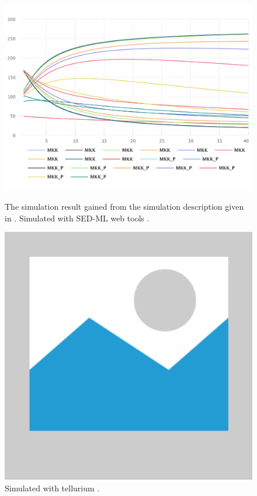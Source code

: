 \begin{figure}[ht]
    \centering
    \begin{minipage}{0.47\textwidth}
        \centering
        \includegraphics[width=1.0\textwidth]{examples/parameter-scan-2d/results/sedml_webtools/plot1}
        \caption{The simulation result gained from the simulation description given in . Simulated with SED-ML web tools \citep{bergmann2017sed}.}
    \end{minipage}\hfill
    \begin{minipage}{0.47\textwidth}
        \centering
        \includegraphics[width=1.0\textwidth]{examples/placeholder}
        \caption{Simulated with tellurium \citep{tellurium}.}
    \end{minipage}
    \label{fig:parameter-scan-2d}
\end{figure}

